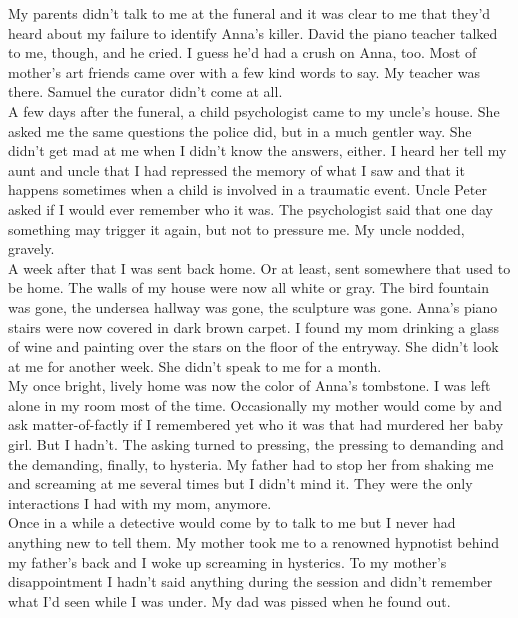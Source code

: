 \documentclass[a5paper]{scrartcl}
\begin{document}
My parents didn't talk to me at the funeral and it was clear to me that they'd heard about my failure to identify Anna's killer. David the piano teacher talked to me, though, and he cried. I guess he'd had a crush on Anna, too. Most of mother's art friends came over with a few kind words to say. My teacher was there. Samuel the curator didn't come at all.\\


A few days after the funeral, a child psychologist came to my uncle's house. She asked me the same questions the police did, but in a much gentler way. She didn't get mad at me when I didn't know the answers, either. I heard her tell my aunt and uncle that I had repressed the memory of what I saw and that it happens sometimes when a child is involved in a traumatic event. Uncle Peter asked if I would ever remember who it was. The psychologist said that one day something may trigger it again, but not to pressure me. My uncle nodded, gravely.\\


A week after that I was sent back home. Or at least, sent somewhere that used to be home. The walls of my house were now all white or gray. The bird fountain was gone, the undersea hallway was gone, the sculpture was gone. Anna's piano stairs were now covered in dark brown carpet.  I found my mom drinking a glass of wine and painting over the stars on the floor of the entryway. She didn't look at me for another week. She didn't speak to me for a month.\\


My once bright, lively home was now the color of Anna's tombstone. I was left alone in my room most of the time. Occasionally my mother would come by and ask matter-of-factly if I remembered yet who it was that had murdered her baby girl. But I hadn't. The asking turned to pressing, the pressing to demanding and the demanding, finally, to hysteria. My father had to stop her from shaking me and screaming at me several times but I didn't mind it. They were the only interactions I had with my mom, anymore. \\


Once in a while a detective would come by to talk to me but I never had anything new to tell them. My mother took me to a renowned hypnotist behind my father's back and I woke up screaming in hysterics. To my mother's disappointment I hadn't said anything during the session and didn't remember what I'd seen while I was under. My dad was pissed when he found out. \\
\end{document}
